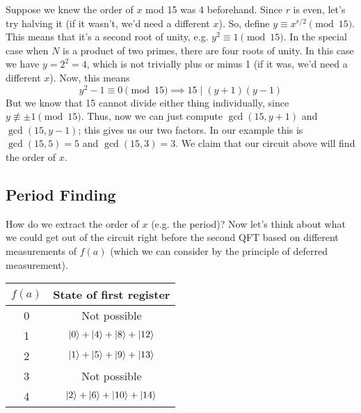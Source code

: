 Suppose we knew the order of $x$ mod 15
was 4 beforehand. Since $r$ is even, let's try halving it (if it wasn't, we'd need a different $x$).
So, define $y \equiv x^{r/2} \pmod{15}$. This means that it's a second root of unity, e.g. $y^2 \equiv 1 \pmod{15}$.
In the special case when $N$ is a product of two primes, there are four roots of unity. In this case we have $y = 2^2 = 4$,
which is not trivially plus or minus 1 (if it was, we'd need a different $x$). Now, this means
\[ y^2 - 1 \equiv 0 \pmod{15} \implies 15 \mid (y + 1)(y - 1) \]
But we know that 15 cannot divide either thing individually, since $y \not\equiv \pm 1 \pmod{15}$.
Thus, now we can just compute $\gcd(15, y + 1)$ and $\gcd(15, y - 1)$; this gives us our two factors. In our example this is $\gcd(15, 5) = 5$ and
$\gcd(15, 3) = 3$. We claim that our circuit above will find the order of $x$.

\subsection{Period Finding}
How do we extract the order of $x$ (e.g. the period)?
Now let's think about what we could get out of the circuit right before the second QFT based on different measurements of $f(a)$ (which
we can consider by the principle of deferred measurement).

\begin{center}
\begin{tabular}[center]{c|c}
    $f(a)$ & State of first register \\ \hline
    0 & Not possible \\
    1 & $\ket{0} + \ket{4} + \ket{8} + \ket{12}$ \\
    2 & $\ket{1} + \ket{5} + \ket{9} + \ket{13}$ \\
    3 & Not possible \\
    4 & $\ket{2} + \ket{6} + \ket{10} + \ket{14}$
\end{tabular}
\end{center}

